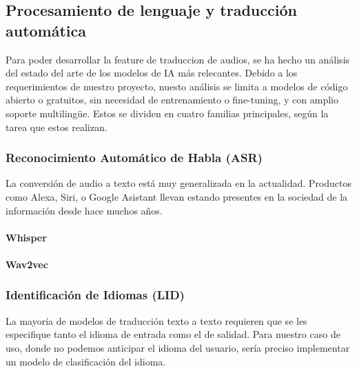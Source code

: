 \subsection{Procesamiento de lenguaje y traducción automática}


Para poder desarrollar la feature de traduccion de audios, se ha hecho un análisis del estado del arte de los modelos de IA más relecantes. Debido a los requerimientos de nuestro proyecto, nuesto análisis se limita a modelos de código abierto o gratuitos, sin necesidad de entrenamiento o fine-tuning, y con amplio soporte multilingüe. Estos se dividen en cuatro familias principales, según la tarea que estos realizan.

\subsubsection{Reconocimiento Automático de Habla (ASR)}  
La conversión de audio a texto está muy generalizada en la actualidad. Productos como Alexa, Siri, o Google Asistant llevan estando presentes en la sociedad de la información desde hace muchos años.

\paragraph{Whisper}

\paragraph{Wav2vec}



\subsubsection{Identificación de Idiomas (LID)}  
La mayoría de modelos de traducción texto a texto requieren que se les especifique tanto el idioma de entrada como el de salidad. Para nuestro caso de uso, donde no podemos anticipar el idioma del usuario, sería preciso implementar un modelo de clasificación del idioma.


